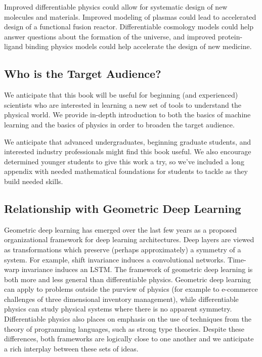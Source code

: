 \documentclass[book.tex]{subfiles}
\begin{document}
Improved differentiable physics could allow for systematic design of new molecules and materials. Improved modeling of plasmas could lead to accelerated design of a functional fusion reactor. Differentiable cosmology models could help answer questions about the formation of the universe, and improved protein-ligand binding physics models could help accelerate the design of new medicine. 

\subsection{Who is the Target Audience?}

We anticipate that this book will be useful for beginning (and experienced) scientists who are interested in learning a new set of tools to understand the physical world. We provide in-depth introduction to both the basics of machine learning and the basics of physics in order to broaden the target audience. 

We anticipate that advanced undergraduates, beginning graduate students, and interested industry professionals might find this book useful. We also encourage determined younger students to give this work a try, so we've included a long appendix with needed mathematical foundations for students to tackle as they build needed skills.


\subsection{Relationship with Geometric Deep Learning}

Geometric deep learning has emerged over the last few years as a proposed organizational framework for deep learning architectures. Deep layers are viewed as transformations which preserve (perhaps approximately) a symmetry of a system. For example, shift invariance induces a convolutional networks. Time-warp invariance induces an LSTM. The framework of geometric deep learning is both more and less general than differentiable physics. Geometric deep learning can apply to problems outside the purview of physics (for example to e-commerce challenges of three dimensional inventory management), while differentiable physics can study physical systems where there is no apparent symmetry. Differentiable physics also places on emphasis on the use of techniques from the theory of programming languages, such as strong type theories. Despite these differences, both frameworks are logically close to one another and we anticipate a rich interplay between these sets of ideas.
\end{document}
